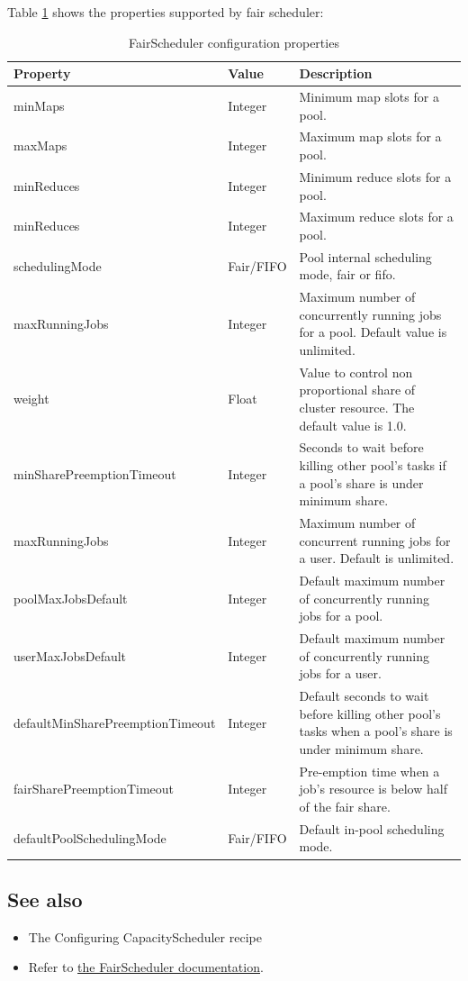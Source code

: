 Table \ref{tbl:fairscheduler} shows the properties supported by fair scheduler:
\begin{table}[ht]
  \centering
  \scriptsize
  \begin{tabular}{p{}p{}p{}}
    \toprule 
    \textbf{Property} & \textbf{Value} & \textbf{Description} \\ \midrule
    minMaps & Integer & Minimum map slots for a pool. \\
    maxMaps & Integer & Maximum map slots for a pool.\\
    minReduces & Integer & Minimum reduce slots for a pool.\\
    minReduces & Integer & Maximum reduce slots for a pool.\\
    schedulingMode & Fair/FIFO & Pool internal scheduling mode, fair or fifo. \\
    maxRunningJobs & Integer & Maximum number of concurrently running jobs for a pool. Default value is unlimited. \\
    weight & Float & Value to control non proportional share of cluster resource. The default value is 1.0. \\
    minSharePreemptionTimeout & Integer & Seconds to wait before killing other pool's tasks if a pool's share is under minimum share. \\
    maxRunningJobs & Integer & Maximum number of concurrent running jobs for a user. Default is unlimited.\\
    poolMaxJobsDefault & Integer & Default maximum number of concurrently running jobs for a pool.\\
    userMaxJobsDefault & Integer & Default maximum number of concurrently running jobs for a user. \\
    defaultMinSharePreemptionTimeout & Integer & Default seconds to wait before killing other pool's tasks when a pool's share is under minimum share. \\
    fairSharePreemptionTimeout & Integer & Pre-emption time when a job's resource is below half of the fair share.\\
    defaultPoolSchedulingMode & Fair/FIFO & Default in-pool scheduling mode. \\ \bottomrule
  \end{tabular}
  \caption{FairScheduler configuration properties}\label{tbl:fairscheduler}
\end{table}
\subsection*{See also}
\begin{itemize}
\item The Configuring CapacityScheduler recipe
\item Refer to \href{http://hadoop.apache.org/docs/r1.1.2/fair_scheduler.html}{the FairScheduler documentation}.
\end{itemize}

